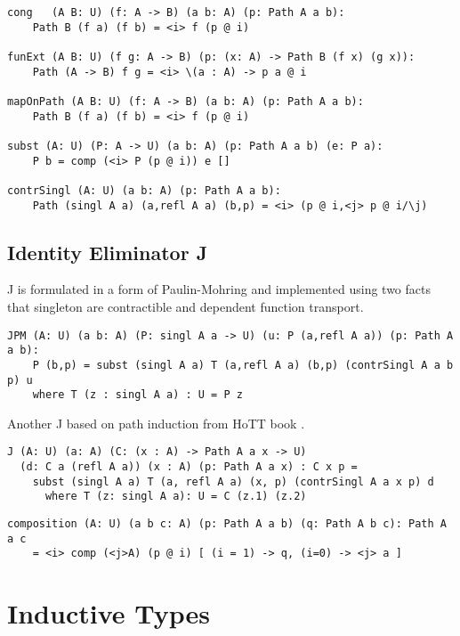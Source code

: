 \begin{lstlisting}[mathescape=true]
cong   (A B: U) (f: A -> B) (a b: A) (p: Path A a b):
    Path B (f a) (f b) = <i> f (p @ i)

funExt (A B: U) (f g: A -> B) (p: (x: A) -> Path B (f x) (g x)):
    Path (A -> B) f g = <i> \(a : A) -> p a @ i

mapOnPath (A B: U) (f: A -> B) (a b: A) (p: Path A a b):
    Path B (f a) (f b) = <i> f (p @ i)

subst (A: U) (P: A -> U) (a b: A) (p: Path A a b) (e: P a):
    P b = comp (<i> P (p @ i)) e []

contrSingl (A: U) (a b: A) (p: Path A a b):
    Path (singl A a) (a,refl A a) (b,p) = <i> (p @ i,<j> p @ i/\j)
\end{lstlisting}

\subsection*{Identity Eliminator J}

J is formulated in a form of Paulin-Mohring and implemented
using two facts that singleton are contractible and dependent function transport.

\begin{lstlisting}[mathescape=true]
JPM (A: U) (a b: A) (P: singl A a -> U) (u: P (a,refl A a)) (p: Path A a b):
    P (b,p) = subst (singl A a) T (a,refl A a) (b,p) (contrSingl A a b p) u
    where T (z : singl A a) : U = P z
\end{lstlisting}

Another J based on path induction from HoTT book \cite{HoTT13}.

\begin{lstlisting}[mathescape=true]
J (A: U) (a: A) (C: (x : A) -> Path A a x -> U)
  (d: C a (refl A a)) (x : A) (p: Path A a x) : C x p =
    subst (singl A a) T (a, refl A a) (x, p) (contrSingl A a x p) d
      where T (z: singl A a): U = C (z.1) (z.2)
\end{lstlisting}

\begin{lstlisting}[mathescape=true]
composition (A: U) (a b c: A) (p: Path A a b) (q: Path A b c): Path A a c
    = <i> comp (<j>A) (p @ i) [ (i = 1) -> q, (i=0) -> <j> a ]
\end{lstlisting}

\section{Inductive Types}

